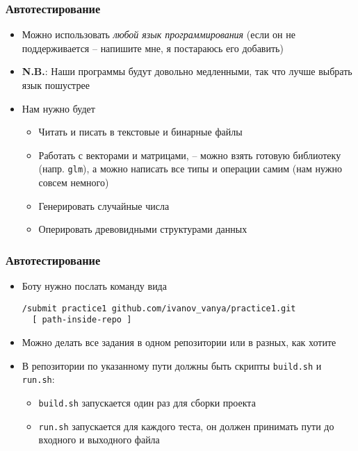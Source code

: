 \documentclass[10pt]{beamer}
\begin{document}
\begin{frame}[fragile]
\frametitle{Автотестирование}
\begin{itemize}
\item Можно использовать \textit{любой язык программирования} (если он не поддерживается -- напишите мне, я постараюсь его добавить)
\pause
\item \alert{\textbf{N.B.}}: Наши программы будут довольно медленными, так что лучше выбрать язык пошустрее
\pause
\item Нам нужно будет
\begin{itemize}
\item Читать и писать в текстовые и бинарные файлы
\pause
\item Работать с векторами и матрицами, -- можно взять готовую библиотеку (напр. \texttt{glm}), а можно написать все типы и операции самим (нам нужно совсем немного)
\pause
\item Генерировать случайные числа
\pause
\item Оперировать древовидными структурами данных
\end{itemize}
\end{itemize}
\end{frame}

\begin{frame}[fragile]
\frametitle{Автотестирование}
\begin{itemize}
\item Боту нужно послать команду вида
\begin{verbatim}
/submit practice1 github.com/ivanov_vanya/practice1.git
  [ path-inside-repo ]
\end{verbatim}
\pause
\item Можно делать все задания в одном репозитории или в разных, как хотите
\pause
\item В репозитории по указанному пути должны быть скрипты \texttt{build.sh} и \texttt{run.sh}:
\begin{itemize}
\item \texttt{build.sh} запускается один раз для сборки проекта
\item \texttt{run.sh} запускается для каждого теста, он должен принимать пути до входного и выходного файла
\end{itemize}
\end{itemize}
\end{frame}
\end{document}

